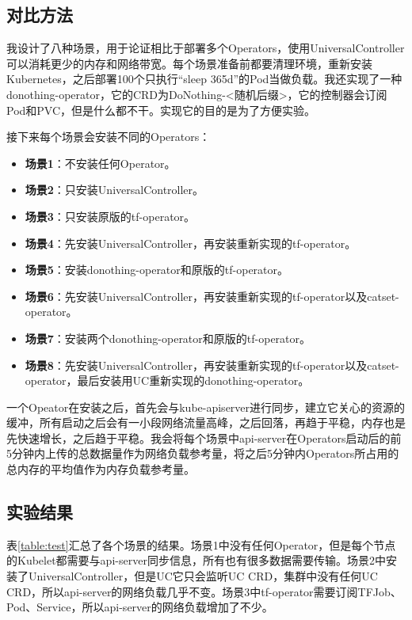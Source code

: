 \documentclass[macfonts,master]{njuthesis}
\begin{document}
\subsection{对比方法}

我设计了八种场景，用于论证相比于部署多个Operators，使用UniversalController可以消耗更少的内存和网络带宽。每个场景准备前都要清理环境，重新安装Kubernetes，之后部署100个只执行``sleep 365d''的Pod当做负载。我还实现了一种donothing-operator，它的CRD为DoNothing-<随机后缀>，它的控制器会订阅Pod和PVC，但是什么都不干。实现它的目的是为了方便实验。

接下来每个场景会安装不同的Operators：
\begin{itemize}
	\item \textbf{场景1}：不安装任何Operator。
	\item \textbf{场景2}：只安装UniversalController。
	\item \textbf{场景3}：只安装原版的tf-operator。
	\item \textbf{场景4}：先安装UniversalController，再安装重新实现的tf-operator。
	\item \textbf{场景5}：安装donothing-operator和原版的tf-operator。
	\item \textbf{场景6}：先安装UniversalController，再安装重新实现的tf-operator以及catset-operator。
	\item \textbf{场景7}：安装两个donothing-operator和原版的tf-operator。
	\item \textbf{场景8}：先安装UniversalController，再安装重新实现的tf-operator以及catset-operator，最后安装用UC重新实现的donothing-operator。
\end{itemize}

一个Opeator在安装之后，首先会与kube-apiserver进行同步，建立它关心的资源的缓冲，所有启动之后会有一小段网络流量高峰，之后回落，再趋于平稳，内存也是先快速增长，之后趋于平稳。我会将每个场景中api-server在Operators启动后的前5分钟内上传的总数据量作为网络负载参考量，将之后5分钟内Operators所占用的总内存的平均值作为内存负载参考量。

\subsection{实验结果}
表\ref{table:test}汇总了各个场景的结果。场景1中没有任何Operator，但是每个节点的Kubelet都需要与api-server同步信息，所有也有很多数据需要传输。场景2中安装了UniversalController，但是UC它只会监听UC CRD，集群中没有任何UC CRD，所以api-server的网络负载几乎不变。场景3中tf-operator需要订阅TFJob、Pod、Service，所以api-server的网络负载增加了不少。
\end{document}
